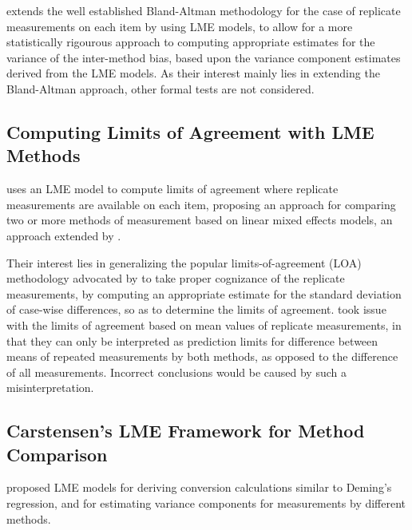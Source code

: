 \documentclass[12pt, a4paper]{report}
\theoremstyle{plain}
\theoremstyle{definition}
\theoremstyle{remark}
\begin{document}
\citet{BXC2008} extends the well established Bland-Altman methodology for the case of replicate measurements on each item by using LME models, to allow for a more statistically rigourous approach to computing appropriate estimates for the variance of the inter-method bias, based upon the variance component estimates derived from the LME models. As their interest mainly lies in extending the Bland-Altman approach, other formal tests are not considered.




\subsection{Computing Limits of Agreement with LME Methods }

\citet{BXC2004} uses an LME model to compute limits of agreement where replicate measurements are available on each item, proposing an approach for comparing two or more methods of measurement based on linear mixed effects models, an approach extended by \citet{BXC2008}.

Their interest lies in generalizing the popular limits-of-agreement (LOA) methodology advocated by \citet{BA86} to take proper cognizance of the replicate measurements, by computing an appropriate estimate for the standard deviation of case-wise differences, so as to determine the limits of agreement.
\citet{BXC2008} took issue with the limits of agreement based on mean values of replicate measurements, in that they can only be interpreted as prediction limits for difference between means of repeated measurements by both methods, as opposed to the difference of all measurements.
Incorrect conclusions would be caused by such a misinterpretation.



\subsection{Carstensen's LME Framework for Method Comparison}

\citet{BXC2004} proposed LME models for deriving conversion calculations similar to Deming's regression, and for
estimating variance components for measurements by different methods.
\end{document}
